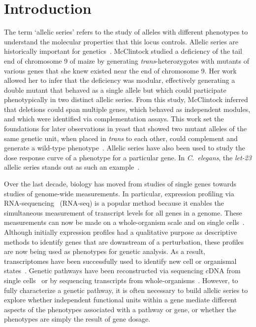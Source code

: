 \documentclass[10pt, twocolumn]{article}
\newcommand{\cel}{\emph{C.~elegans}}
\newcommand{\gene}[1]{\mbox{\emph{#1}}}
\begin{document}
\linenumbers{}

\section*{Introduction}
The term `allelic series' refers to the study of alleles with different
phenotypes to understand the molecular properties that this locus controls.
Allelic series are historically important for genetics~\cite{McClintock1944}.
McClintock studied a deficiency of the tail end of chromosome 9 of
maize by generating \emph{trans}-heterozygotes with mutants of various genes
that she knew existed near the end of chromosome 9. Her work allowed her to
infer that the deficiency was modular, effectively generating a double mutant
that behaved as a single allele but which could participate phenotypically in
two distinct allelic series. From this study, McClintock inferred that deletions
could span multiple genes, which behaved as independent modules, and which were
identified via complementation assays. This work set the foundations for later
observations in yeast that showed two mutant alleles of the same genetic unit,
when placed in \emph{trans} to each other, could complement and generate a
wild-type phenotype~\cite{FINCHAM1957}. Allelic series have also been used to
study the dose response curve of a phenotype for a particular gene. In \cel{},
the \gene{let-23} allelic series stands out as such an example~\cite{}.

Over the last decade, biology has moved from studies of single genes towards
studies of genome-wide measurements. In particular, expression profiling via
RNA-sequencing~\cite{Mortazavi2008} (RNA-seq) is a popular method because it
enables the simultaneous measurement of transcript levels for all genes in a
genome. These measurements can now be made on a whole-organism scale and on
single cells~\cite{Tang2009}. Although initially expression profiles had a
qualitative purpose as descriptive methods to identify genes that are downstream
of a perturbation, these profiles are now being used as phenotypes for genetic
analysis. As a result, transcriptomes have been successfully used to identify
new cell or organismal states~\cite{Angeles-Albores2017,Villani2017}. Genetic
pathways have been reconstructed via sequencing cDNA from single
cells~\cite{Dixit2016} or by sequencing transcripts from
whole-organisms~\cite{}. However, to fully characterize a genetic pathway, it is
often necessary to build allelic series to explore whether independent functional
units within a gene mediate different aspects of the phenotypes associated with
a pathway or gene, or whether the phenotypes are simply the result of gene
dosage.
\end{document}
